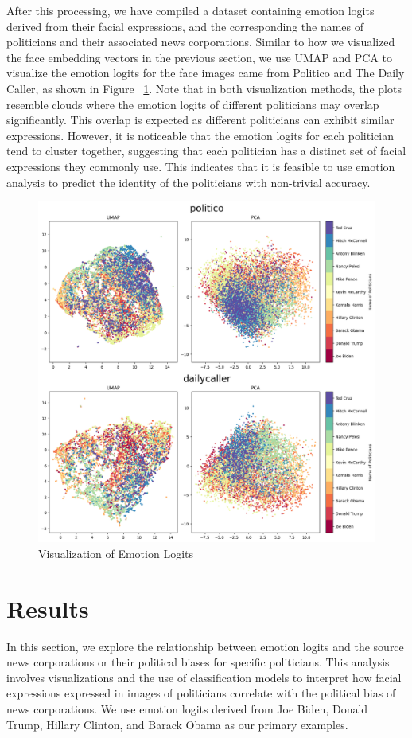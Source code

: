 \documentclass[sigconf]{acmart}
\begin{document}

After this processing, we have compiled a dataset containing emotion logits derived from their facial expressions, and the corresponding the names of politicians and their associated news corporations. Similar to how we visualized the face embedding vectors in the previous section, we use UMAP and PCA to visualize the emotion logits for the face images came from Politico and The Daily Caller, as shown in Figure ~\ref{fig:emo_logits}. Note that in both visualization methods, the plots resemble clouds where the emotion logits of different politicians may overlap significantly. This overlap is expected as different politicians can exhibit similar expressions. However, it is noticeable that the emotion logits for each politician tend to cluster together, suggesting that each politician has a distinct set of facial expressions they commonly use. This indicates that it is feasible to use emotion analysis to predict the identity of the politicians with non-trivial accuracy.

\begin{figure}
    \centering
    \includegraphics[width=.5\textwidth]{assets/emotion_logit.png}
    \caption{Visualization of Emotion Logits}
    \label{fig:emo_logits}
    \vspace{10pt}
\end{figure}



\section{Results}\label{sec:results}

In this section, we explore the relationship between emotion logits and the source news corporations or their political biases for specific politicians. This analysis involves visualizations and the use of classification models to interpret how facial expressions expressed in images of politicians correlate with the political bias of news corporations. We use emotion logits derived from Joe Biden, Donald Trump, Hillary Clinton, and Barack Obama as our primary examples.
\end{document}
